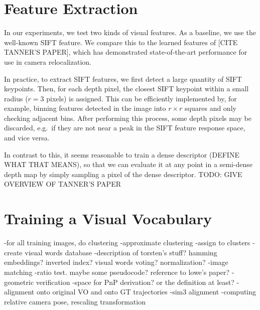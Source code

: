 \section{Feature Extraction}
In our experiments, we test two kinds of visual features. As a baseline, we use the well-known SIFT feature. We compare this to the learned features of [CITE TANNER'S PAPER], which has demonstrated state-of-the-art performance for use in camera relocalization.

In practice, to extract SIFT features, we first detect a large quantity of SIFT keypoints. Then, for each depth pixel, the closest SIFT keypoint within a small radius ($r=3$ pixels) is assigned. This can be efficiently implemented by, for example, binning features detected in the image into $r \times r$ squares and only checking adjacent bins. After performing this process, some depth pixels may be discarded, e.g.\ if they are not near a peak in the SIFT feature response space, and vice versa.

In contrast to this, it seems reasonable to train a dense descriptor (DEFINE WHAT THAT MEANS), so that we can evaluate it at any point in a semi-dense depth map by simply sampling a pixel of the dense descriptor. TODO: GIVE OVERVIEW OF TANNER'S PAPER

\section{Training a Visual Vocabulary}
	
-for all training images, do clustering
	-approximate clustering
	-assign to clusters
-create visual words database
	-description of torsten's stuff? hamming embeddings? inverted index? visual words voting? normalization?
-image matching
	-ratio test. maybe some pseudocode? reference to lowe's paper?
-geometric verification
	-space for PnP derivation? or the definition at least?
-alignment onto original VO and onto GT trajectories
	-sim3 alignment
	-computing relative camera pose, rescaling transformation
